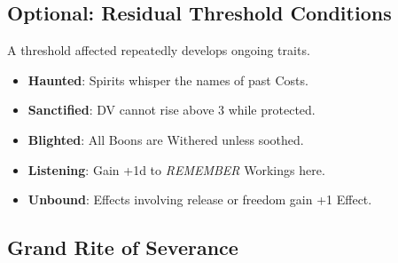 \documentclass[11pt]{book}
\begin{document}
\subsection*{Optional: Residual Threshold Conditions}

A threshold affected repeatedly develops ongoing traits.

\begin{itemize}[noitemsep]
    \item \textbf{Haunted}: Spirits whisper the names of past Costs.
    \item \textbf{Sanctified}: DV cannot rise above 3 while protected.
    \item \textbf{Blighted}: All Boons are Withered unless soothed.
    \item \textbf{Listening}: Gain +1d to \emph{REMEMBER} Workings here.
    \item \textbf{Unbound}: Effects involving release or freedom gain +1 Effect.
\end{itemize}

\subsection*{Grand Rite of Severance}
\end{document}
